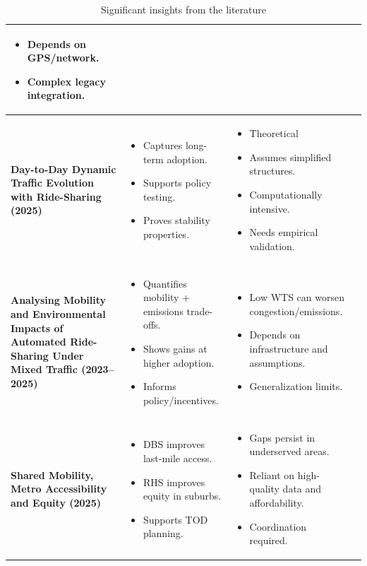 \documentclass[10pt,a4paper]{report}
\begin{document}
\begin{table}[h!]
\begin{tabular}{|p{3.5cm}|p{4cm}|p{4cm}|p{4.2cm}|}
\begin{itemize}[leftmargin=*,nosep]
\item Depends on GPS/network.
\item Complex legacy integration.
\end{itemize} \\ \hline
\textbf{Day-to-Day Dynamic Traffic Evolution with Ride-Sharing (2025)}
 &
\begin{itemize}[leftmargin=*,nosep]
\item Captures long-term adoption.
\item Supports policy testing.
\item Proves stability properties.
\end{itemize} &
\begin{itemize}[leftmargin=*,nosep]
\item Theoretical
\item Assumes simplified structures.
\item Computationally intensive.
\item Needs empirical validation.
\end{itemize} \\ \hline
\textbf{Analysing Mobility and Environmental Impacts of Automated Ride-Sharing Under Mixed Traffic (2023–2025)}  &
\begin{itemize}[leftmargin=*,nosep]
\item Quantifies mobility + emissions trade-offs.
\item Shows gains at higher adoption.
\item Informs policy/incentives.
\end{itemize} &
\begin{itemize}[leftmargin=*,nosep]
\item Low WTS can worsen congestion/emissions.
\item Depends on infrastructure and assumptions.
\item Generalization limits.
\end{itemize} \\ \hline
\textbf{Shared Mobility, Metro Accessibility and Equity (2025)}  &
\begin{itemize}[leftmargin=*,nosep]
\item DBS improves last-mile access.
\item RHS improves equity in suburbs.
\item Supports TOD planning.
\end{itemize} &
\begin{itemize}[leftmargin=*,nosep]
\item Gaps persist in underserved areas.
\item Reliant on high-quality data and affordability.
\item Coordination required.
\end{itemize} \\ \hline
\end{tabular}
\caption{Significant insights from the literature}
\label{tab:lit_insights}
\end{table}
\end{document}
